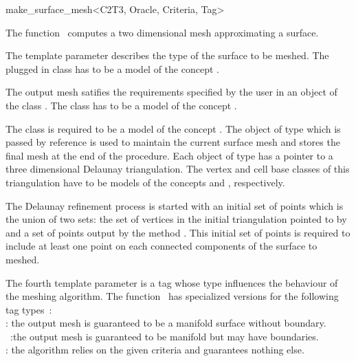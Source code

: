 

\begin{ccRefFunction}{make_surface_mesh<C2T3, Oracle,
Criteria, Tag>}  %


\ccDefinition
  
The function \ccRefName\ computes a two dimensional mesh 
approximating  a surface.

The template parameter  describes the type of the 
surface  to be meshed. 
The plugged in class 
has to be a model of the concept .

The output mesh satifies the requirements specified by the user
in an object of the class .
The class  has to be
a model of the concept .

 The class 
is required to be a model of the concept
.
The object  of type  which is passed by reference
is used to maintain  the current surface mesh and stores
the final mesh at the end of the procedure.
Each object of type  has a pointer to 
a three dimensional  Delaunay triangulation.
The vertex and cell base classes of this triangulation
have  to be  models  of the concepts 
 and 
, respectively.

The Delaunay refinement
process is started with an initial set of points which is the union 
of two sets: the
set of vertices in the initial  triangulation pointed to by 
 and a set of
points output by the method .
This initial set of points is required to include at least one point
on each connected components of the surface to meshed.

The fourth template parameter is a tag whose type influences the behaviour of the
meshing algorithm. The function \ccRefName\  has specialized versions
for the following  tag types~: \\
: the output mesh is guaranteed to be a manifold
surface without boundary.\\
~:the output mesh is guaranteed to be
manifold but may have boundaries.\\
 : the algorithm relies on the given criteria and
guarantees nothing else.




\end{ccRefFunction}
